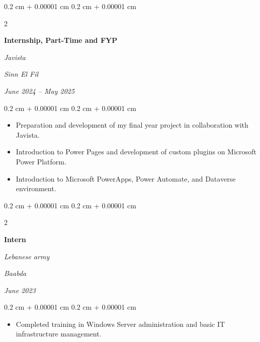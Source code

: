 \documentclass[10pt, letterpaper]{article}
\newenvironment{highlights}{
    \begin{itemize}[
        topsep=0.10 cm,
        parsep=0.10 cm,
        partopsep=0pt,
        itemsep=0pt,
        leftmargin=0.4 cm + 10pt
    ]
}{
    \end{itemize}
} %
\newenvironment{onecolentry}{
    \begin{adjustwidth}{
        0.2 cm + 0.00001 cm
    }{
        0.2 cm + 0.00001 cm
    }
}{
    \end{adjustwidth}
} %
\newenvironment{twocolentry}[2][]{
    \onecolentry
    \def\secondColumn{#2}
    \setcolumnwidth{\fill, 4.5 cm}
    \begin{paracol}{2}
}{
    \switchcolumn \raggedleft \secondColumn
    \end{paracol}
    \endonecolentry
} %
\begin{document}
         \vspace{0.2 cm}

         \begin{twocolentry}{
        \textit{Sinn El Fil}    
            
        \textit{June 2024 – May 2025}}
            \textbf{Internship, Part-Time and FYP}
            
            \textit{Javista}
        \end{twocolentry}
        \vspace{0.10 cm}
        \begin{onecolentry}
        
            \begin{highlights}
                \item Preparation and development of my final year project in collaboration with Javista.
                \item Introduction to Power Pages and development of custom plugins on Microsoft Power Platform.
                \item Introduction to Microsoft PowerApps, Power Automate, and Dataverse environment.
    \end{highlights}
                
            
        \end{onecolentry}











        

        


        

       


        \begin{twocolentry}{
        \textit{Baabda}    
            
        \textit{June 2023}}
            \textbf{Intern}
            
            \textit{Lebanese army}
        \end{twocolentry}
        \vspace{0.10 cm}
        \begin{onecolentry}
        
            \begin{highlights}
                \item Completed training in Windows Server administration and basic IT infrastructure management.
    \end{highlights}
                
            
        \end{onecolentry}
        
\end{document}

